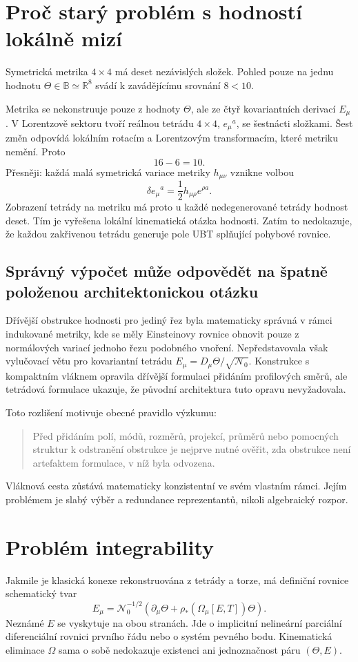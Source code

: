 \section{Proč starý problém s hodností lokálně mizí}
Symetrická metrika $4\times4$ má deset nezávislých složek. Pohled pouze na
jednu hodnotu $\Theta\in\mathbb B\simeq\mathbb R^8$ svádí k zavádějícímu
srovnání $8<10$.

Metrika se nekonstruuje pouze z hodnoty $\Theta$, ale ze čtyř kovariantních
derivací $E_\mu$. V Lorentzově sektoru tvoří reálnou tetrádu
$4\times4$, $e_\mu{}^a$, se šestnácti složkami. Šest změn odpovídá lokálním
rotacím a Lorentzovým transformacím, které metriku nemění. Proto
\[
 16-6=10.
\]
Přesněji: každá malá symetrická variace metriky $h_{\mu\nu}$ vznikne volbou
\[
 \delta e_\mu{}^a=\frac12 h_{\mu\rho}e^{\rho a}.
\]
Zobrazení tetrády na metriku má proto u každé nedegenerované tetrády
hodnost deset. Tím je vyřešena lokální kinematická otázka hodnosti. Zatím
to nedokazuje, že každou zakřivenou tetrádu generuje pole UBT splňující
pohybové rovnice.

\subsection{Správný výpočet může odpovědět na špatně položenou architektonickou otázku}
Dřívější obstrukce hodnosti pro jediný řez byla matematicky správná v
rámci indukované metriky, kde se měly Einsteinovy rovnice obnovit pouze z
normálových variací jednoho řezu podobného vnoření. Nepředstavovala však
vylučovací větu pro kovariantní tetrádu
$E_\mu=D_\mu\Theta/\sqrt{\mathcal N_0}$. Konstrukce s kompaktním vláknem
opravila dřívější formulaci přidáním profilových směrů, ale tetrádová
formulace ukazuje, že původní architektura tuto opravu nevyžadovala.

Toto rozlišení motivuje obecné pravidlo výzkumu:

\begin{quote}
Před přidáním polí, módů, rozměrů, projekcí, průměrů nebo pomocných
struktur k odstranění obstrukce je nejprve nutné ověřit, zda obstrukce není
artefaktem formulace, v níž byla odvozena.
\end{quote}

Vláknová cesta zůstává matematicky konzistentní ve svém vlastním rámci.
Jejím problémem je slabý výběr a redundance reprezentantů, nikoli algebraický
rozpor.

\section{Problém integrability}
Jakmile je klasická konexe rekonstruována z tetrády a torze, má definiční
rovnice schematický tvar
\[
 E_\mu=\mathcal N_0^{-1/2}
 \left(\partial_\mu\Theta+\rho_*(\Omega_\mu[E,T])\Theta\right).
\]
Neznámé $E$ se vyskytuje na obou stranách. Jde o implicitní nelineární
parciální diferenciální rovnici prvního řádu nebo o systém pevného bodu.
Kinematická eliminace $\Omega$ sama o sobě nedokazuje existenci ani
jednoznačnost páru $(\Theta,E)$.

